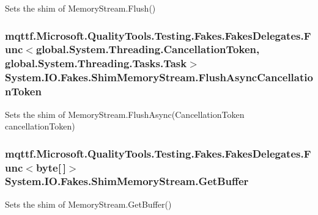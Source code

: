 Sets the shim of Memory\-Stream.\-Flush()

\hypertarget{class_system_1_1_i_o_1_1_fakes_1_1_shim_memory_stream_abd0da6a8ebefd94b84f83067431e9df1}{
\subsubsection[{Flush\-Async\-Cancellation\-Token}]{\setlength{\rightskip}{0pt plus 5cm}mqttf.\-Microsoft.\-Quality\-Tools.\-Testing.\-Fakes.\-Fakes\-Delegates.\-Func$<$global.\-System.\-Threading.\-Cancellation\-Token, global.\-System.\-Threading.\-Tasks.\-Task$>$ System.\-I\-O.\-Fakes.\-Shim\-Memory\-Stream.\-Flush\-Async\-Cancellation\-Token\hspace{0.3cm}{\ttfamily [set]}}}\label{class_system_1_1_i_o_1_1_fakes_1_1_shim_memory_stream_abd0da6a8ebefd94b84f83067431e9df1}


Sets the shim of Memory\-Stream.\-Flush\-Async(\-Cancellation\-Token cancellation\-Token)

\hypertarget{class_system_1_1_i_o_1_1_fakes_1_1_shim_memory_stream_a37ecbd7d3da63badc9f845088ac2e0d3}{
\subsubsection[{Get\-Buffer}]{\setlength{\rightskip}{0pt plus 5cm}mqttf.\-Microsoft.\-Quality\-Tools.\-Testing.\-Fakes.\-Fakes\-Delegates.\-Func$<$byte\mbox{[}$\,$\mbox{]}$>$ System.\-I\-O.\-Fakes.\-Shim\-Memory\-Stream.\-Get\-Buffer\hspace{0.3cm}{\ttfamily [set]}}}\label{class_system_1_1_i_o_1_1_fakes_1_1_shim_memory_stream_a37ecbd7d3da63badc9f845088ac2e0d3}


Sets the shim of Memory\-Stream.\-Get\-Buffer()

